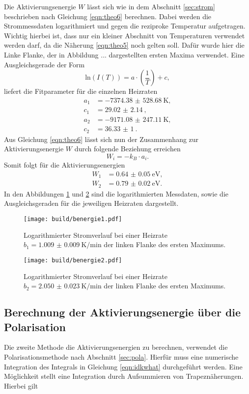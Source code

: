 Die Aktivierungsenergie $W$ lässt sich wie in dem Abschnitt \ref{sec:strom} beschrieben nach Gleichung \eqref{eqn:theo6} berechnen. Dabei werden die Strommessdaten logarithmiert und gegen 
die reziproke Temperatur aufgetragen. Wichtig hierbei ist, dass nur ein kleiner Abschnitt von Temperaturen verwendet werden darf, da
die Näherung \eqref{eqn:theo5} noch gelten soll. Dafür wurde hier die Linke Flanke, der in Abbildung ... dargestellten ersten Maxima verwendet. Eine Ausgleichsgerade der Form
\begin{equation}
\text{ln}(I(T)) = a \cdot \left( \frac{1}{T}\right) + c,
\end{equation}
liefert die Fitparameter für die einzelnen Heizraten
\begin{align*}
a_1 &= \SI{-7374.38(52868)}{\kelvin},\\
c_1&= \SI{29.02(214)}{},\\
a_2 &= \SI{-9171.08(24711)}{\kelvin},\\
c_2&= \SI{36.33(100)}{}.
\end{align*}
Aus Gleichung \eqref{eqn:theo6} lässt sich nun der Zusammenhang zur Aktivierungsenergie $W$ durch folgende Beziehung erreichen
\begin{equation}
W_i = - k_B \cdot a_i.
\end{equation}
Somit folgt für die Aktivierungsenergien 
\begin{align}
W_1 &= \SI{0.64(5)}{\electronvolt},\\
W_2 &= \SI{0.79(2)}{\electronvolt}.
\end{align}
In den Abbildungen \ref{fig:a4} und \ref{fig:a5} sind die logarithmierten Messdaten, sowie die Ausgleichsgeraden für die jeweiligen Heizraten dargestellt.
\begin{figure}
    \centering
    \texttt{[image: build/benergie1.pdf]}
    \caption{Logarithmierter Stromverlauf bei einer Heizrate \newline $b_1 = \SI{1.009(9)}{\kelvin\per\minute}$ der linken Flanke des ersten Maximums.
            }
    \label{fig:a4}
\end{figure}
\begin{figure}
    \centering
    \texttt{[image: build/benergie2.pdf]}
    \caption{Logarithmierter Stromverlauf bei einer Heizrate \newline $b_2 = \SI{2.050(23)}{\kelvin\per\minute}$ der linken Flanke des ersten Maximums.
            }
    \label{fig:a5}
\end{figure}

\subsection{Berechnung der Aktivierungsenergie über die Polarisation}
Die zweite Methode die Aktivierungsenergien zu berechnen, verwendet die Polarisationsmethode nach Abschnitt \ref{sec:pola}. Hierfür muss eine numerische 
Integration des Integrals in Gleichung \eqref{eqn:idkwhat} durchgeführt werden. Eine Möglichkeit stellt eine Integration durch
Aufsummieren von Trapeznäherungen. Hierbei gilt 